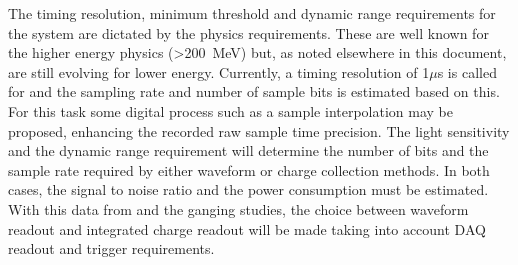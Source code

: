 The timing resolution, minimum threshold and dynamic range requirements for the system are dictated by the physics requirements. These are well known for the higher energy physics (>\SI{200}{MeV}) but, as noted elsewhere in this document, are still evolving for lower energy. Currently, 
a timing resolution of 1$\mu$s is called for and the sampling rate and number of sample bits is estimated based on this. For this task 
some digital process such as a sample interpolation may be proposed, enhancing the recorded raw sample time precision.
The light sensitivity and the dynamic range requirement will determine the number of bits and the sample rate required by either waveform or charge collection methods. In both cases, the signal to noise ratio and the power consumption must be estimated.  
With this data from  and the ganging studies, the choice between waveform readout and integrated charge readout will be made taking into account DAQ  readout and trigger requirements. 






